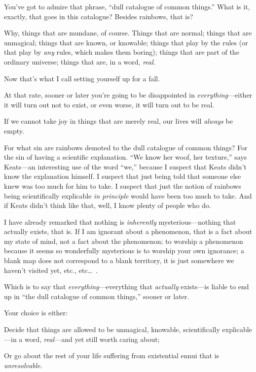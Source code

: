 {
 You've got to admire that phrase,
``dull catalogue of common things.''
What is it, exactly, that goes in this catalogue? Besides rainbows,
that is?}

{
 Why, things that are mundane, of course. Things that are normal;
things that are unmagical; things that are known, or knowable; things
that play by the rules (or that play by \textit{any} rules, which makes
them boring); things that are part of the ordinary universe; things
that are, in a word, \textit{real.}}

{
 Now that's what I call setting yourself up for a
fall.}

{
 At that rate, sooner or later you're going to be
disappointed in \textit{everything}{}---either it will turn out not to
exist, or even worse, it will turn out to be real.}

{
 If we cannot take joy in things that are merely real, our lives
will \textit{always} be empty.}

{
 For what sin are rainbows demoted to the dull catalogue of common
things? For the sin of having a scientific explanation.
``We know her woof, her texture,''
says Keats---an interesting use of the word
``we,'' because I suspect that Keats
didn't know the explanation himself. I suspect that
just being told that someone else knew was too much for him to take. I
suspect that just the notion of rainbows being scientifically
explicable \textit{in principle} would have been too much to take. And
if Keats didn't think like that, well, I know plenty of
people who do.}

{
 I have already remarked that nothing is \textit{inherently}
mysterious---nothing that actually exists, that is. If I am ignorant
about a phenomenon, that is a fact about my state of mind, not a fact
about the phenomenon; to worship a phenomenon because it seems so
wonderfully mysterious is to worship your own ignorance; a blank map
does not correspond to a blank territory, it is just somewhere we
haven't visited yet, etc., etc\ldots~.}

{
 Which is to say that \textit{everything}{}---everything that
\textit{actually} exists---is liable to end up in
``the dull catalogue of common
things,'' sooner or later.}

{
 Your choice is either:}

{
 Decide that things are allowed to be unmagical, knowable,
scientifically explicable---in a word, \textit{real}{}---and yet still
worth caring about;}

{
 Or go about the rest of your life suffering from existential ennui
that is \textit{unresolvable}.}

